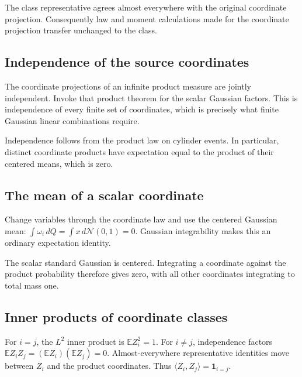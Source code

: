 \documentclass[11pt,a4paper]{report}
\begin{document}
The class representative agrees almost everywhere with the original coordinate projection. Consequently law and moment calculations made for the coordinate projection transfer unchanged to the class.

\subsection{\texorpdfstring{Independence of the source coordinates}{Independence of the source coordinates}}
\label{report-step-UnadjustedLangevin-GaussianHilbert-lean-5}


The coordinate projections of an infinite product measure are jointly independent. Invoke that product theorem for the scalar Gaussian factors. This is independence of every finite set of coordinates, which is precisely what finite Gaussian linear combinations require.



Independence follows from the product law on cylinder events. In particular, distinct coordinate products have expectation equal to the product of their centered means, which is zero.

\subsection{\texorpdfstring{The mean of a scalar coordinate}{The mean of a scalar coordinate}}
\label{report-step-UnadjustedLangevin-GaussianHilbert-lean-6}


Change variables through the coordinate law and use the centered Gaussian mean: \(\int\omega_i\,dQ=\int x\,d\mathcal N(0,1)=0\). Gaussian integrability makes this an ordinary expectation identity.



The scalar standard Gaussian is centered. Integrating a coordinate against the product probability therefore gives zero, with all other coordinates integrating to total mass one.

\subsection{\texorpdfstring{Inner products of coordinate classes}{Inner products of coordinate classes}}
\label{report-step-UnadjustedLangevin-GaussianHilbert-lean-7}


For \(i=j\), the \(L^2\) inner product is \(\mathbb EZ_i^2=1\). For \(i\ne j\), independence factors \(\mathbb EZ_iZ_j=(\mathbb EZ_i)(\mathbb EZ_j)=0\). Almost-everywhere representative identities move between \(Z_i\) and the product coordinates. Thus \(\langle Z_i,Z_j\rangle=\mathbf1_{i=j}\).
\end{document}
